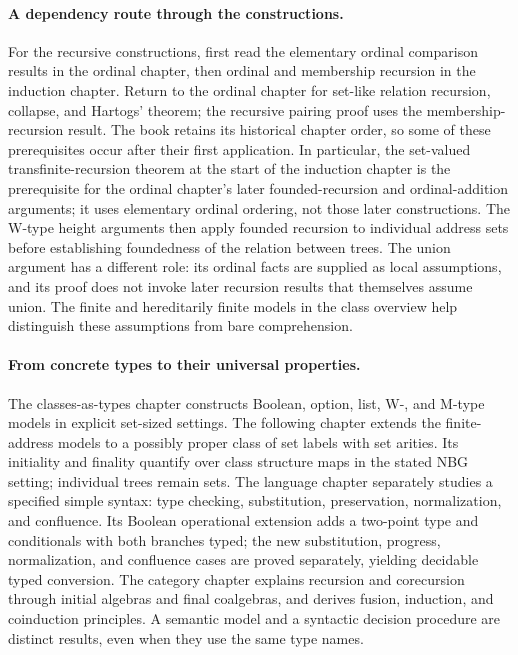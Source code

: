 \paragraph{A dependency route through the constructions.}
For the recursive constructions, first read the elementary ordinal
comparison results in the ordinal chapter, then ordinal and membership
recursion in the induction chapter. Return to the ordinal chapter for
set-like relation recursion, collapse, and Hartogs' theorem; the recursive
pairing proof uses the membership-recursion result. The book retains its
historical chapter order, so some of these prerequisites occur after their
first application. In particular, the set-valued transfinite-recursion
theorem at the start of the induction chapter is the prerequisite for the
ordinal chapter's later founded-recursion and ordinal-addition arguments;
it uses elementary ordinal ordering, not those later constructions.
The W-type height arguments then apply founded recursion to individual
address sets before establishing foundedness of the relation between trees.
The union argument has a different role: its ordinal
facts are supplied as local assumptions, and its proof does not invoke
later recursion results that themselves assume union. The finite and
hereditarily finite models in the class overview help distinguish these
assumptions from bare comprehension.

\paragraph{From concrete types to their universal properties.}
The classes-as-types chapter constructs Boolean, option, list, W-, and
M-type models in explicit set-sized settings. The following chapter
extends the finite-address models to a possibly proper class of set
labels with set arities. Its initiality and finality quantify over class
structure maps in the stated NBG setting; individual trees remain sets.
The language chapter
separately studies a specified simple syntax: type checking, substitution,
preservation, normalization, and confluence. Its Boolean operational
extension adds a two-point type and conditionals with both branches
typed; the new substitution, progress, normalization, and confluence
cases are proved separately, yielding decidable typed conversion.
The category chapter explains
recursion and corecursion through initial algebras and final coalgebras,
and derives fusion, induction, and coinduction principles. A semantic
model and a syntactic decision procedure are distinct results, even when
they use the same type names.


